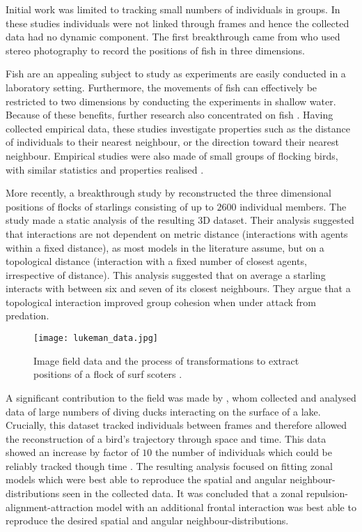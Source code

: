 Initial work was limited to tracking small numbers of individuals in groups. In these studies individuals were not linked through frames and hence the collected data had no dynamic component. The first breakthrough came from \citet{cullen65} who used stereo photography to record the positions of fish in three dimensions.

Fish are an appealing subject to study as experiments are easily conducted in a laboratory setting. Furthermore, the movements of fish can effectively be restricted to two dimensions by conducting the experiments in shallow water. Because of these benefits, further research also concentrated on fish \citep{van_long85, partridge80}. Having collected empirical data, these studies investigate properties such as the distance of individuals to their nearest neighbour, or the direction toward their nearest neighbour. Empirical studies were also made of small groups of flocking birds, with similar statistics and properties realised \citep{major78, budgey98}.

More recently, a breakthrough study by \citet{ballerini08} reconstructed the three dimensional positions of flocks of starlings consisting of up to $2600$ individual members. The study made a static analysis of the resulting 3D dataset. Their analysis suggested that interactions are not dependent on metric distance (interactions with agents within a fixed distance), as most models in the literature assume, but on a topological distance (interaction with a fixed number of closest agents, irrespective of distance). This analysis suggested that on average a starling interacts with between six and seven of its closest neighbours. They argue that a topological interaction improved group cohesion when under attack from predation.

\begin{figure}[t]
	\texttt{[image: lukeman\_data.jpg]}
	\caption{Image field data and the process of transformations to extract positions of a flock of surf scoters \citep{lukeman10}.}
	\label{fig:lukeman_extraction}
\end{figure}

A significant contribution to the field was made by \citet{lukeman10}, whom collected and analysed data of large numbers of diving ducks interacting on the surface of a lake. Crucially, this dataset tracked individuals between frames and therefore allowed the reconstruction of a bird's trajectory through space and time. This data showed an increase by factor of $10$ the number of individuals which could be reliably tracked though time \citep{lukeman09}. The resulting analysis focused on fitting zonal models which were best able to reproduce the spatial and angular neighbour-distributions seen in the collected data. It was concluded that a zonal repulsion-alignment-attraction model with an additional frontal interaction was best able to reproduce the desired spatial and angular neighbour-distributions.

